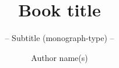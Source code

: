 \documentclass[graybox,envcountchap,sectrefs]{SNmono}
\begin{document}
\author{Author name(s)}
\title{Book title}
\subtitle{-- Subtitle (monograph-type) --}
\maketitle

\frontmatter%







\tableofcontents



\mainmatter%




\backmatter%


\printindex

\end{document}

